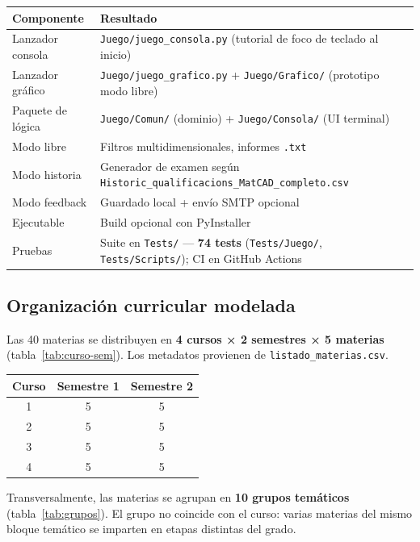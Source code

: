 \documentclass[11pt,a4paper]{article}
\newcommand{\iniciotabla}{\par\medskip\renewcommand{\arraystretch}{1.12}}
\newcommand{\fintabla}{\par\medskip}
\begin{document}
\begin{tabular}{@{}lp{8cm}@{}}
\toprule
\textbf{Componente} & \textbf{Resultado} \\
\midrule
Lanzador consola & \texttt{Juego/juego\_consola.py} (tutorial de foco de teclado al inicio) \\
Lanzador gráfico & \texttt{Juego/juego\_grafico.py} + \texttt{Juego/Grafico/} (prototipo modo libre) \\
Paquete de lógica & \texttt{Juego/Comun/} (dominio) + \texttt{Juego/Consola/} (UI terminal) \\
Modo libre & Filtros multidimensionales, informes \texttt{.txt} \\
Modo historia & Generador de examen según \texttt{Historic\_qualificacions\_MatCAD\_completo.csv} \\
Modo feedback & Guardado local + envío SMTP opcional \\
Ejecutable & Build opcional con PyInstaller \\
Pruebas & Suite en \texttt{Tests/} --- \textbf{74 tests} (\texttt{Tests/Juego/}, \texttt{Tests/Scripts/}); CI en GitHub Actions \\
\bottomrule
\end{tabular}

\subsection{Organización curricular modelada}

Las 40 materias se distribuyen en \textbf{4 cursos × 2 semestres × 5 materias} (tabla~\ref{tab:curso-sem}). Los metadatos provienen de \texttt{listado\_materias.csv}.

\iniciotabla
\begin{tabular}{@{}ccc@{}}
\toprule
\textbf{Curso} & \textbf{Semestre 1} & \textbf{Semestre 2} \\
\midrule
1 & 5 & 5 \\
2 & 5 & 5 \\
3 & 5 & 5 \\
4 & 5 & 5 \\
\bottomrule
\end{tabular}
\label{tab:curso-sem}
\fintabla

Transversalmente, las materias se agrupan en \textbf{10 grupos temáticos} (tabla~\ref{tab:grupos}). El grupo no coincide con el curso: varias materias del mismo bloque temático se imparten en etapas distintas del grado.
\end{document}
